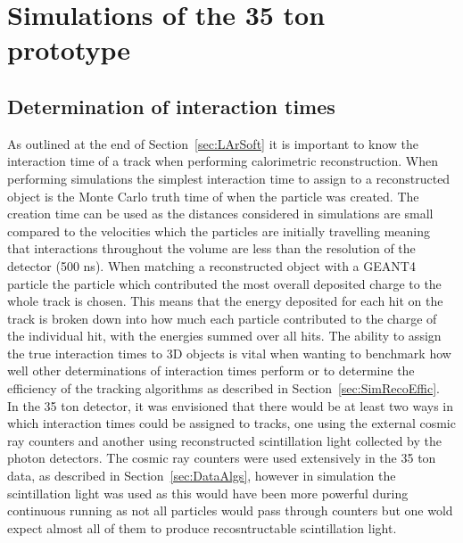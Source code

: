 
\chapter{Simulations of the 35 ton prototype}  %

\graphicspath{{35tonSimulation/Figs/PDF/}{35tonSimulation/Figs/Raster/}{35tonSimulation/Figs/}}

\section{Determination of interaction times} \label{sec:SimInteractionTimes} %
As outlined at the end of Section~\ref{sec:LArSoft} it is important to know the interaction time of a track when performing calorimetric reconstruction. When performing simulations the simplest interaction time to assign to a reconstructed object is the Monte Carlo truth time of when the particle was created. The creation time can be used as the distances considered in simulations are small compared to the velocities which the particles are initially travelling meaning that interactions throughout the volume are less than the resolution of the detector (500 ns). When matching a reconstructed object with a GEANT4 particle the particle which contributed the most overall deposited charge to the whole track is chosen. This means that the energy deposited for each hit on the track is broken down into how much each particle contributed to the charge of the individual hit, with the energies summed over all hits. The ability to assign the true interaction times to 3D objects is vital when wanting to benchmark how well other determinations of interaction times perform or to determine the efficiency of the tracking algorithms as described in Section~\ref{sec:SimRecoEffic}. \\

In the 35 ton detector, it was envisioned that there would be at least two ways in which interaction times could be assigned to tracks, one using the external cosmic ray counters and another using reconstructed scintillation light collected by the photon detectors. The cosmic ray counters were used extensively in the 35 ton data, as described in Section~\ref{sec:DataAlgs}, however in simulation the scintillation light was used as this would have been more powerful during continuous running as not all particles would pass through counters but one wold expect almost all of them to produce recosntructable scintillation light.


